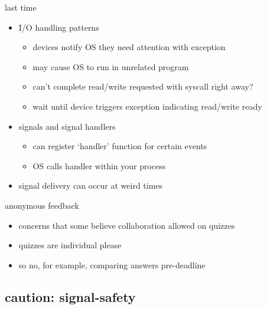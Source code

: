 \date{}
\title{}
\date{}

\begin{frame}
    \titlepage
\end{frame}



\begin{frame}{last time}
    \begin{itemize}
    \item I/O handling patterns
        \begin{itemize}
        \item devices notify OS they need attention with exception
        \item may cause OS to run in unrelated program
        \item can't complete read/write requested with syscall right away?
        \item wait until device triggers exception indicating read/write ready
        \end{itemize}
    \item signals and signal handlers
        \begin{itemize}
        \item can register `handler' function for certain events
        \item OS calls handler within your process
        \end{itemize}
    \item signal delivery can occur at weird times
    \end{itemize}
\end{frame}

\begin{frame}{anonymous feedback}
    \begin{itemize}
    \item concerns that some believe collaboration allowed on quizzes
    \vspace{.5cm}
    \item quizzes are individual please
    \item so no, for example, comparing answers pre-deadline
    \end{itemize}
\end{frame}

\subsection{caution: signal-safety}


